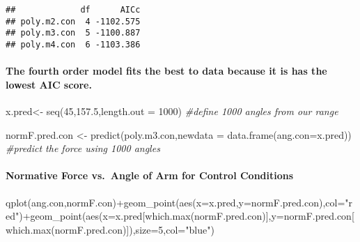 \documentclass[
]{article}
\newenvironment{Shaded}{\begin{snugshade}}{\end{snugshade}}
\newcommand{\AttributeTok}[1]{\textcolor[rgb]{0.77,0.63,0.00}{#1}}
\newcommand{\CommentTok}[1]{\textcolor[rgb]{0.56,0.35,0.01}{\textit{#1}}}
\newcommand{\DecValTok}[1]{\textcolor[rgb]{0.00,0.00,0.81}{#1}}
\newcommand{\FloatTok}[1]{\textcolor[rgb]{0.00,0.00,0.81}{#1}}
\newcommand{\FunctionTok}[1]{\textcolor[rgb]{0.00,0.00,0.00}{#1}}
\newcommand{\NormalTok}[1]{#1}
\newcommand{\OtherTok}[1]{\textcolor[rgb]{0.56,0.35,0.01}{#1}}
\newcommand{\SpecialCharTok}[1]{\textcolor[rgb]{0.00,0.00,0.00}{#1}}
\newcommand{\StringTok}[1]{\textcolor[rgb]{0.31,0.60,0.02}{#1}}
\begin{document}
\begin{verbatim}
##             df      AICc
## poly.m2.con  4 -1102.575
## poly.m3.con  5 -1100.887
## poly.m4.con  6 -1103.386
\end{verbatim}

\hypertarget{the-fourth-order-model-fits-the-best-to-data-because-it-is-has-the-lowest-aic-score.}{%
\paragraph{The fourth order model fits the best to data because it is
has the lowest AIC
score.}\label{the-fourth-order-model-fits-the-best-to-data-because-it-is-has-the-lowest-aic-score.}}

\begin{Shaded}
\begin{Highlighting}[]
\NormalTok{x.pred}\OtherTok{\textless{}{-}} \FunctionTok{seq}\NormalTok{(}\DecValTok{45}\NormalTok{,}\FloatTok{157.5}\NormalTok{,}\AttributeTok{length.out =} \DecValTok{1000}\NormalTok{) }\CommentTok{\#define 1000 angles from our range}

\NormalTok{normF.pred.con }\OtherTok{\textless{}{-}} \FunctionTok{predict}\NormalTok{(poly.m3.con,}\AttributeTok{newdata =} \FunctionTok{data.frame}\NormalTok{(}\AttributeTok{ang.con=}\NormalTok{x.pred)) }\CommentTok{\#predict the force using 1000 angles}
\end{Highlighting}
\end{Shaded}

\hypertarget{normative-force-vs.-angle-of-arm-for-control-conditions}{%
\paragraph{Normative Force vs.~Angle of Arm for Control
Conditions}\label{normative-force-vs.-angle-of-arm-for-control-conditions}}

\begin{Shaded}
\begin{Highlighting}[]
\FunctionTok{qplot}\NormalTok{(ang.con,normF.con)}\SpecialCharTok{+}\FunctionTok{geom\_point}\NormalTok{(}\FunctionTok{aes}\NormalTok{(}\AttributeTok{x=}\NormalTok{x.pred,}\AttributeTok{y=}\NormalTok{normF.pred.con),}\AttributeTok{col=}\StringTok{"red"}\NormalTok{)}\SpecialCharTok{+}\FunctionTok{geom\_point}\NormalTok{(}\FunctionTok{aes}\NormalTok{(}\AttributeTok{x=}\NormalTok{x.pred[}\FunctionTok{which.max}\NormalTok{(normF.pred.con)],}\AttributeTok{y=}\NormalTok{normF.pred.con[}\FunctionTok{which.max}\NormalTok{(normF.pred.con)]),}\AttributeTok{size=}\DecValTok{5}\NormalTok{,}\AttributeTok{col=}\StringTok{"blue"}\NormalTok{)}
\end{Highlighting}
\end{Shaded}
\end{document}
